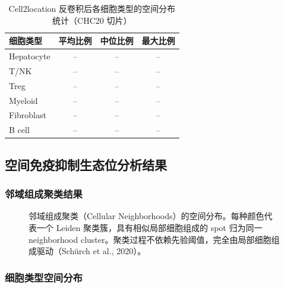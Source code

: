 \documentclass[12pt, a4paper]{ctexart}
\begin{document}
\begin{table}[H]
\centering
\caption{Cell2location 反卷积后各细胞类型的空间分布统计（CHC20 切片）}
\label{tab:cell_proportion}
\begin{tabular}{lccc}
\toprule
\textbf{细胞类型} & \textbf{平均比例} & \textbf{中位比例} & \textbf{最大比例} \\
\midrule
Hepatocyte & -- & -- & -- \\
T/NK & -- & -- & -- \\
Treg & -- & -- & -- \\
Myeloid & -- & -- & -- \\
Fibroblast & -- & -- & -- \\
B cell & -- & -- & -- \\
\bottomrule
\end{tabular}
\end{table}

\subsection{空间免疫抑制生态位分析结果}

\subsubsection{邻域组成聚类结果}

\begin{figure}[H]
\centering
\caption{邻域组成聚类（Cellular Neighborhoods）的空间分布。每种颜色代表一个 Leiden 聚类簇，具有相似局部细胞组成的 spot 归为同一 neighborhood cluster。聚类过程不依赖先验阈值，完全由局部细胞组成驱动（Schürch et al., 2020）。}
\label{fig:neighborhood_clusters}
\end{figure}

\subsubsection{细胞类型空间分布}
\end{document}
